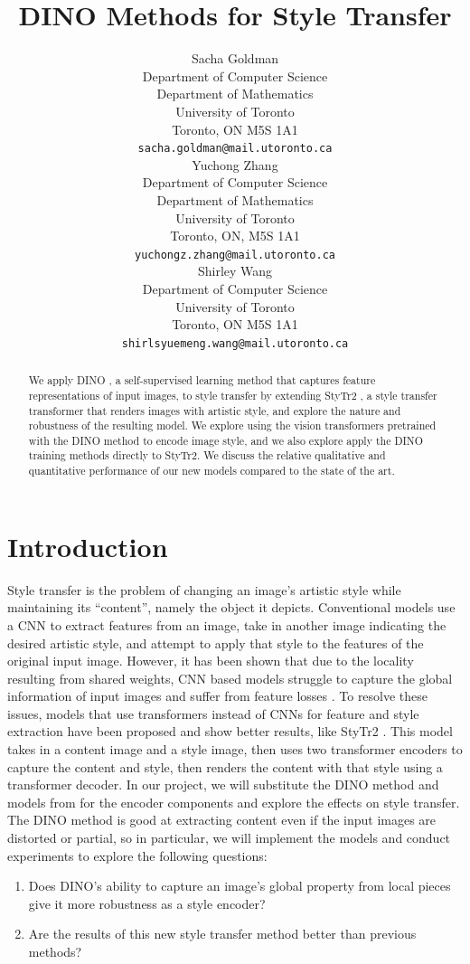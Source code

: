 \documentclass{article}
\title{DINO Methods for Style Transfer}
\author{
	Sacha Goldman \\
	Department of Computer Science\\ 
	Department of Mathematics\\
	University of Toronto\\
	Toronto, ON M5S 1A1 \\
	\texttt{sacha.goldman@mail.utoronto.ca} \\
	\And
	Yuchong Zhang \\
	Department of Computer Science \\
	Department of Mathematics \\
	University of Toronto \\
	Toronto, ON, M5S 1A1 \\
	\texttt{yuchongz.zhang@mail.utoronto.ca} \\
	\And
	Shirley Wang \\
	Department of Computer Science \\
	University of Toronto \\
	Toronto, ON M5S 1A1 \\
	\texttt{shirlsyuemeng.wang@mail.utoronto.ca} \\
}
\begin{document}
\maketitle

\begin{abstract}
We apply DINO \cite{DINO}, a self-supervised learning method that captures feature representations of input images, to style transfer by extending StyTr2 \cite{ImageStyleTransformer}, a style transfer transformer that renders images with artistic style, and explore the nature and robustness of the resulting model. We explore using the vision transformers pretrained with the DINO method to encode image style, and we also explore apply the DINO training methods directly to StyTr2. We discuss the relative qualitative and quantitative performance of our new models compared to the state of the art.
\end{abstract}

\section{Introduction}
Style transfer is the problem of changing an image's artistic style while maintaining its ``content'', namely the object it depicts. Conventional models use a CNN to extract features from an image, take in another image indicating the desired artistic style, and attempt to apply that style to the features of the original input image. However, it has been shown that due to the locality resulting from shared weights, CNN based models struggle to capture the global information of input images and suffer from feature losses \cite{ImageStyleTransformer}. To resolve these issues, models that use transformers instead of CNNs for feature and style extraction have been proposed and show better results, like StyTr2 \cite{ImageStyleTransformer}. This model takes in a content image and a style image, then uses two transformer encoders to capture the content and style, then renders the content with that style using a transformer decoder. In our project, we will substitute the DINO method and models from \cite{DINO} for the encoder components and explore the effects on style transfer. The DINO method is good at extracting content even if the input images are distorted or partial, so in particular, we will implement the models and conduct experiments to explore the following questions:
\begin{enumerate}
	\item Does DINO's ability to capture an image's global property from local pieces give it more robustness as a style encoder?
	\item Are the results of this new style transfer method better than previous methods?
\end{enumerate}
\end{document}
